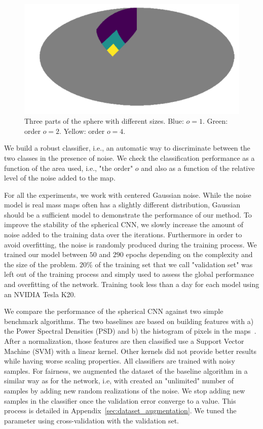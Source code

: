\documentclass[final,twocolumn,3p,times,authoryear]{elsarticle}
\newcommand{\1}{\b{1}}              %
\newcommand{\0}{\b{0}}              %
\begin{document}
\begin{figure}[!ht]
\centering
\includegraphics[width=\linewidth]{part_sphere}
\caption{Three parts of the sphere with different sizes. Blue: $o=1$. Green: order $o=2$. Yellow: order $o=4$.}
\label{fig:part_sphere}
\end{figure}

We build a robust classifier, i.e., an automatic way to
discriminate between the two classes in the presence of noise.
We check the classification performance as a function of the area used, i.e., "the order" $o$ and also as a function of the relative level of the noise added to the map.

For all the experiments, we work with centered Gaussian noise.
While the noise model is real mass maps often has a slightly different distribution, Gaussian should be a sufficient model to demonstrate the performance of our method.
To improve the stability of the spherical CNN, we slowly increase the amount of noise added to
the training data over the iterations. Furthermore in order to avoid
overfitting, the noise is randomly produced during the training process. We trained our
model between $50$ and $290$ epochs depending on the complexity and the size of
the problem. $20\%$ of the training set that we call "validation set" was left out of the training process and simply used to assess the global performance and overfitting of
the network.
Training took less than a day for each model using an NVIDIA Tesla K20.

We compare the performance of the spherical CNN against two simple benchmark
algorithms. The two baselines are based on building features with a) the Power
Spectral Densities (PSD) and b) the histogram of pixels in the maps~\cite{patton2017cosmologicalconstraints}.
After a normalization, those features are then classified use a Support Vector
Machine (SVM) with a linear kernel. Other kernels did not provide better results
while having worse scaling properties. All classifiers are trained with noisy samples. For fairness, we augmented the dataset
of the baseline algorithm in a similar way as for the network, i.e, with
created an "unlimited" number of samples by adding new random realizations of
the noise. We stop adding new samples in the classifier once the validation
error converge to a value. This process is detailed in Appendix~\ref{sec:dataset_augmentation}. We tuned the parameter using cross-validation with the validation set.
\end{document}
